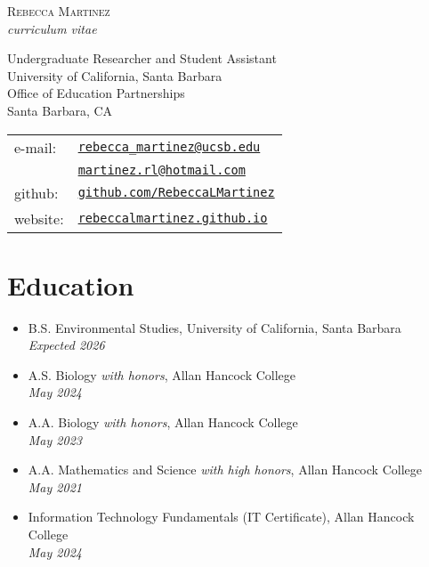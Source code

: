 \documentclass[letterpaper]{article}
\begin{document}
{\LARGE \scshape Rebecca Martinez}\\
{\emph{curriculum vitae}}

\vspace{0.25in}

\begin{minipage}{0.55\linewidth}
Undergraduate Researcher and Student Assistant\\
University of California, Santa Barbara\\
Office of Education Partnerships\\
Santa Barbara, CA
\end{minipage}
\begin{minipage}{0.45\linewidth}
  \begin{tabular}{ll}
    e-mail: & \href{mailto:rebecca_martinez@ucsb.edu}{\tt rebecca\_martinez@ucsb.edu} \\
            & \href{mailto:martinez.rl@hotmail.com}{\tt martinez.rl@hotmail.com} \\
    github: & \href{https://github.com/RebeccaLMartinez}{\tt github.com/RebeccaLMartinez} \\
    website: & \href{https://rebeccalmartinez.github.io/personal_website/}{\tt rebeccalmartinez.github.io}
  \end{tabular}
\end{minipage}

\vspace{0.2in}

\section*{Education}

\begin{itemize}

  \item B.S. Environmental Studies, University of California, Santa Barbara \\
  \textit{Expected 2026}

  \item A.S. Biology \textit{with honors}, Allan Hancock College \\
  \textit{May 2024}

  \item A.A. Biology \textit{with honors}, Allan Hancock College \\
  \textit{May 2023}

  \item A.A. Mathematics and Science \textit{with high honors}, Allan Hancock College \\
  \textit{May 2021}

  \item Information Technology Fundamentals (IT Certificate), Allan Hancock College \\
  \textit{May 2024}

\end{itemize}
\end{document}
